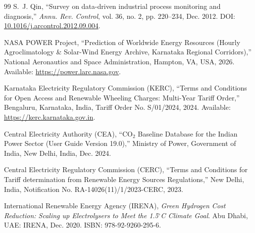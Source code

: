 \documentclass[conference]{IEEEtran}
\begin{document}
\begin{thebibliography}{99}
S.~J. Qin, ``Survey on data-driven industrial process monitoring and diagnosis,'' \emph{Annu. Rev. Control}, vol. 36, no. 2, pp. 220--234, Dec. 2012. DOI: \url{10.1016/j.arcontrol.2012.09.004}.

NASA POWER Project, ``Prediction of Worldwide Energy Resources (Hourly Agroclimatology \& Solar-Wind Energy Archive, Karnataka Regional Corridors),'' National Aeronautics and Space Administration, Hampton, VA, USA, 2026. Available: \url{https://power.larc.nasa.gov}.

Karnataka Electricity Regulatory Commission (KERC), ``Terms and Conditions for Open Access and Renewable Wheeling Charges: Multi-Year Tariff Order,'' Bengaluru, Karnataka, India, Tariff Order No. S/01/2024, 2024. Available: \url{https://kerc.karnataka.gov.in}.

Central Electricity Authority (CEA), ``$\text{CO}_2$ Baseline Database for the Indian Power Sector (User Guide Version 19.0),'' Ministry of Power, Government of India, New Delhi, India, Dec. 2024.

Central Electricity Regulatory Commission (CERC), ``Terms and Conditions for Tariff determination from Renewable Energy Sources Regulations,'' New Delhi, India, Notification No. RA-14026(11)/1/2023-CERC, 2023.

International Renewable Energy Agency (IRENA), \emph{Green Hydrogen Cost Reduction: Scaling up Electrolysers to Meet the 1.5$^\circ$C Climate Goal}. Abu Dhabi, UAE: IRENA, Dec. 2020. ISBN: 978-92-9260-295-6.

\end{thebibliography}
\end{document}
